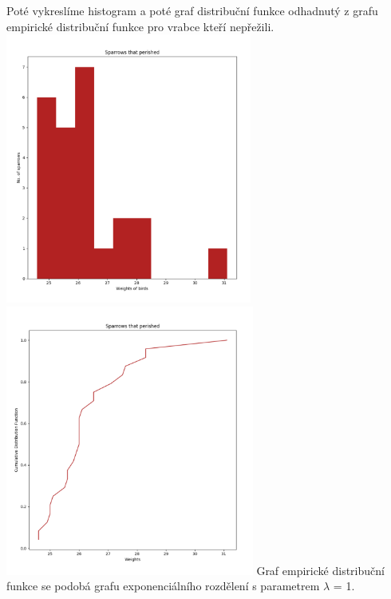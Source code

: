\documentclass[12pt,a4paper]{article}
\begin{document}
Poté vykreslíme histogram a poté graf distribuční funkce odhadnutý z grafu empirické distribuční funkce pro vrabce kteří nepřežili.\\
\includegraphics[height=3.5in]{diedHist}
\includegraphics[height=3.5in]{diedDist}
Graf empirické distribuční funkce se podobá grafu exponenciálního rozdělení s parametrem $\lambda$ = 1.\par \bigskip
\pagebreak
\end{document}
